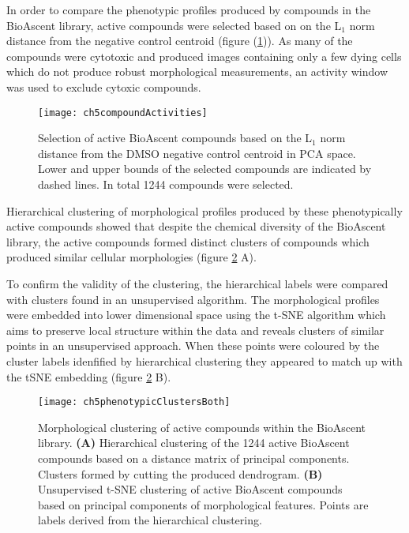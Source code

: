 \documentclass[a4paper,11pt,twoside,openright]{scrbook}
\begin{document}
In order to compare the phenotypic profiles produced by compounds in the BioAscent library, active compounds were selected based on on the L$_1$ norm distance from the negative control centroid (figure (\ref{figure:compound_activity})).
As many of the compounds were cytotoxic and produced images containing only a few dying cells which do not produce robust morphological measurements, an activity window was used to exclude cytoxic compounds.


\begin{figure}
    \captionsetup{width=0.8\textwidth}
    \caption[Selecting active compounds based on distance]{
Selection of active BioAscent compounds based on the L$_1$ norm distance from the DMSO negative control centroid in PCA space.
Lower and upper bounds of the selected compounds are indicated by dashed lines. In total 1244 compounds were selected.}
    \texttt{[image: ch5compoundActivities]}
    \label{figure:compound_activity}
\end{figure}

Hierarchical clustering of morphological profiles produced by these phenotypically active compounds showed that despite the chemical diversity of the BioAscent library, the active compounds formed distinct clusters of compounds which produced similar cellular morphologies (figure \ref{figure:morph_cluster} A).

To confirm the validity of the clustering, the hierarchical labels were compared with clusters found in an unsupervised algorithm.
The morphological profiles were embedded into lower dimensional space using the t-SNE algorithm \cite{tnse_paper} which aims to preserve local structure within the data and reveals clusters of similar points in an unsupervised approach.
When these points were coloured by the cluster labels idenfified by hierarchical clustering they appeared to match up with the tSNE embedding (figure \ref{figure:morph_cluster} B).

\begin{figure}
    \captionsetup{width=0.8\textwidth}
    \caption[Morphological clustering of the BioAscent library]{
Morphological clustering of active compounds within the BioAscent library.
    \textbf{(A)} Hierarchical clustering of the 1244 active BioAscent compounds based on a distance matrix of principal components.
    Clusters formed by cutting the produced dendrogram.
    \textbf{(B)} Unsupervised t-SNE clustering of active BioAscent compounds based on principal components of morphological features.
    Points are labels derived from the hierarchical clustering.
}
    \texttt{[image: ch5phenotypicClustersBoth]}
    \label{figure:morph_cluster}
\end{figure}
\end{document}
